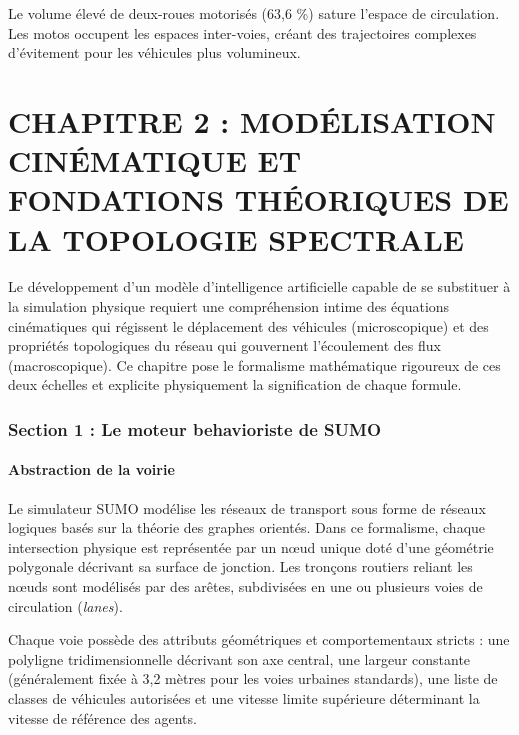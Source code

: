 \documentclass[10pt, a4paper]{article}
\begin{document}
Le volume élevé de deux-roues motorisés (63,6 \%) sature l'espace de
circulation. Les motos occupent les espaces inter-voies, créant des
trajectoires complexes d'évitement pour les véhicules plus volumineux.

\newpage

\section{CHAPITRE 2 : MODÉLISATION CINÉMATIQUE ET FONDATIONS THÉORIQUES
DE LA TOPOLOGIE
SPECTRALE}\label{chapitre-2-moduxe9lisation-cinuxe9matique-et-fondations-thuxe9oriques-de-la-topologie-spectrale}

Le développement d'un modèle d'intelligence artificielle capable de se
substituer à la simulation physique requiert une compréhension intime
des équations cinématiques qui régissent le déplacement des véhicules
(microscopique) et des propriétés topologiques du réseau qui gouvernent
l'écoulement des flux (macroscopique). Ce chapitre pose le formalisme
mathématique rigoureux de ces deux échelles et explicite physiquement la
signification de chaque formule.

\subsubsection{Section 1 : Le moteur behavioriste de
SUMO}\label{section-1-le-moteur-behavioriste-de-sumo}

\paragraph{Abstraction de la voirie}\label{abstraction-de-la-voirie}

Le simulateur SUMO modélise les réseaux de transport sous forme de
réseaux logiques basés sur la théorie des graphes orientés. Dans ce
formalisme, chaque intersection physique est représentée par un nœud
unique doté d'une géométrie polygonale décrivant sa surface de jonction.
Les tronçons routiers reliant les nœuds sont modélisés par des arêtes,
subdivisées en une ou plusieurs voies de circulation (\emph{lanes}).

Chaque voie possède des attributs géométriques et comportementaux
stricts : une polyligne tridimensionnelle décrivant son axe central, une
largeur constante (généralement fixée à 3,2 mètres pour les voies
urbaines standards), une liste de classes de véhicules autorisées et une
vitesse limite supérieure déterminant la vitesse de référence des
agents.
\end{document}
